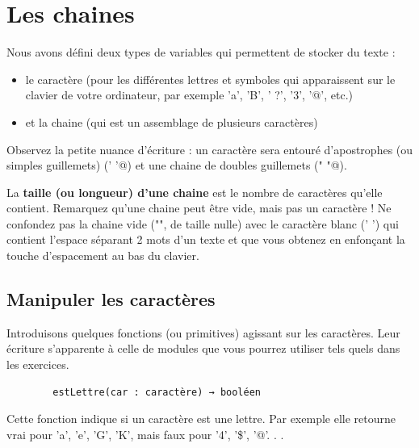 \documentclass[11pt,a4paper]{article}
\begin{document}
            \section{Les chaines}
        Nous avons d\'efini deux types de variables qui permettent de stocker du texte :
        
					\begin{itemize}
				
			\item 
            le caract\`ere (pour les diff\'erentes lettres et symboles qui apparaissent sur le clavier de votre
            ordinateur, par exemple 'a', 'B', ' ?', '3', '@', etc.) 
          
			\item et la chaine (qui est un assemblage de plusieurs caract\`eres)
					\end{itemize}
				
            \par
        
        Observez la petite nuance d'\'ecriture : 
        un caract\`ere sera entour\'e d'apostrophes (ou simples guillemets) (\verb@’ ’@) 
        et une chaine de doubles guillemets (\verb@" "@).
      
            \par
        
        La \textbf{taille (ou longueur) d'une chaine} est le nombre de caract\`eres qu'elle contient. 
        Remarquez qu'une chaine peut \^etre vide, mais pas un caract\`ere ! Ne confondez pas la chaine vide ("", de
        taille nulle) avec le caract\`ere blanc (' ') qui contient l'espace s\'eparant 2 mots d'un texte et
        que vous obtenez en enfon\c cant la touche d'espacement au bas du clavier.
		
            \par
        \subsection{Manipuler les caract\`eres}
        Introduisons quelques fonctions (ou primitives) agissant sur les caract\`eres. Leur \'ecriture
        s'apparente \`a celle de modules que vous pourrez utiliser tels quels dans les exercices. 
      
            \par
        \begin{verbatim}
        estLettre(car : caractère) → booléen
      \end{verbatim}
        Cette fonction indique si un caract\`ere est une lettre. Par exemple elle retourne vrai pour 'a',
        'e', 'G', 'K', mais faux pour '4', '\$', '@'. . .
      
\end{document}
